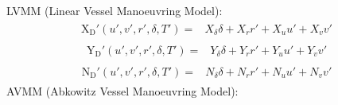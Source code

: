 \documentclass[review]{elsarticle}
\begin{document}
\sphinxAtStartPar
LVMM (Linear Vessel Manoeuvring Model):
\begin{equation}\label{equation:02.01_VMMs:eqxlinear}
\begin{split}\begin{split}
\operatorname{X_{D}'}{\left(u',v',r',\delta,T' \right)} = & X_{\delta} \delta + X_{r} r' + X_{u} u' + X_{v} v' 
\end{split}\end{split}
\end{equation}\begin{equation}\label{equation:02.01_VMMs:eqylinear}
\begin{split}\begin{split}
\operatorname{Y_{D}'}{\left(u',v',r',\delta,T' \right)} = & Y_{\delta} \delta + Y_{r} r' + Y_{u} u' + Y_{v} v' 
\end{split}\end{split}
\end{equation}\begin{equation}\label{equation:02.01_VMMs:eqnlinear}
\begin{split}\begin{split}
\operatorname{N_{D}'}{\left(u',v',r',\delta,T' \right)} = & N_{\delta} \delta + N_{r} r' + N_{u} u' + N_{v} v' 
\end{split}\end{split}
\end{equation}
\sphinxAtStartPar
AVMM (Abkowitz Vessel Manoeuvring Model):
\end{document}
